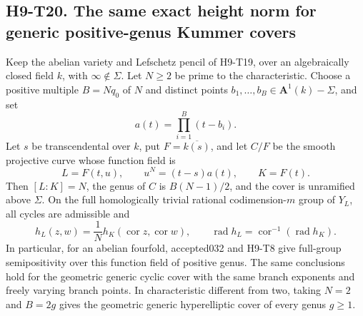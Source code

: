 
\subsection*{H9-T20. The same exact height norm for generic positive-genus Kummer covers}

\begin{theorem}[H9-T20]
Keep the abelian variety and Lefschetz pencil of H9-T19, over
an algebraically closed field $k$, with $\infty\notin\Sigma$.
Let $N\ge2$ be prime to the characteristic. Choose a positive
multiple $B=Nq_0$ of $N$ and distinct points
$b_1,\ldots,b_B\in\mathbf A^1(k)-\Sigma$, and set
\[
                     a(t)=\prod_{i=1}^{B}(t-b_i).
\]
Let $s$ be transcendental over $k$, put $F=\overline{k(s)}$,
and let $C/F$ be the smooth projective curve whose function
field is
\[
 L=F(t,u),\qquad u^N=(t-s)a(t),
                  \qquad K=F(t).
                                                               \tag{H9.101}
\]
Then $[L:K]=N$, the genus of $C$ is $B(N-1)/2$, and the cover
is unramified above $\Sigma$. On the full homologically
trivial rational codimension-$m$ group of $Y_L$, all cycles
are admissible and
\[
 h_L(z,w)=\frac1N h_K(\operatorname{cor}z,
                            \operatorname{cor}w),\qquad
 \operatorname{rad}h_L
       =\operatorname{cor}^{-1}(\operatorname{rad}h_K).
                                                               \tag{H9.102}
\]
In particular, for an abelian fourfold, accepted032 and
H9-T8 give full-group semipositivity over this function field
of positive genus. The same conclusions hold for the
geometric generic cyclic cover with the same branch
exponents and freely varying branch points. In
characteristic different from two, taking $N=2$ and $B=2g$
gives the geometric generic hyperelliptic cover of every
genus $g\ge1$.
\end{theorem}

